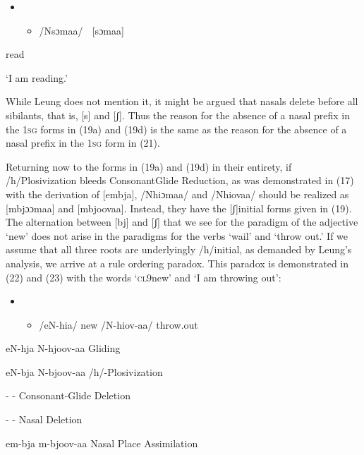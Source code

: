 \documentclass[output=paper]{langsci/langscibook}
\begin{document}
\begin{itemize}
\item \setcounter{itemize}{0}
\begin{itemize}
\item /Nsɔmaa/    [sɔmaa]

\end{itemize}
\end{itemize}

read

‘I am reading.’

While Leung does not mention it, it might be argued that nasals delete before all sibilants, that is, [s] and [ʃ]. Thus the reason for the absence of a nasal prefix in the 1\textsc{sg} forms in (19a) and (19d) is the same as the reason for the absence of a nasal prefix in the 1\textsc{sg} form in (21). 

Returning now to the forms in (19a) and (19d) in their entirety, if /h/Plosivization bleeds ConsonantGlide Reduction, as was demonstrated in (17) with the derivation of [embja], /Nhiɔmaa/ and /Nhiovaa/ should be realized as [mbjɔɔmaa] and [mbjoovaa]. Instead, they have the [ʃ]initial forms given in (19). The alternation between [bj] and [ʃ] that we see for the paradigm of the adjective ‘new’ does not arise in the paradigms for the verbs ‘wail’ and ‘throw out.’ If we assume that all three roots are underlyingly /h/initial, as demanded by Leung’s analysis, we arrive at a rule ordering paradox. This paradox is demonstrated in (22) and (23) with the words ‘\textsc{cl}9new’ and ‘I am throwing out\textsc{’}:

\begin{itemize}
\item \setcounter{itemize}{0}
\begin{itemize}
\item /eN-hia/  new  /N-hiov-aa/  throw.out

\end{itemize}
\end{itemize}

eN-hja      N-hjoov-aa        Gliding

eN-bja      N-bjoov-aa        /h/-Plosivization

{}-        {}-          Consonant-Glide Deletion

{}-        {}-          Nasal Deletion

em-bja      m-bjoov-aa        Nasal Place Assimilation
\end{document}
